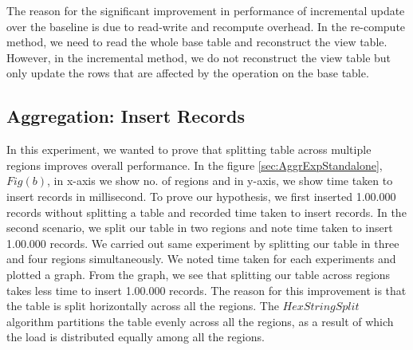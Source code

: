 \documentclass[11pt,a4paper,bibtotoc,idxtotoc,headsepline,footsepline,footexclude,BCOR12mm,DIV13]{scrbook}
\begin{document}
The reason for the significant improvement in performance of incremental update over the baseline is due to read-write and recompute overhead.
In the re-compute method, we need to read the whole base table and
reconstruct the view table. However, in the incremental method, we do not reconstruct the view table but only update the rows that are affected by the operation on the base table. 

\subsection{Aggregation: Insert Records}
\label{Insert Records Aggr}

In this experiment, we wanted to prove that splitting table across multiple regions improves overall performance. In the figure \ref{sec:AggrExpStandalone}, $Fig(b)$, in x-axis we show no. of regions and in y-axis, we show time taken to insert records in millisecond. To prove our hypothesis, we first inserted 1.00.000 records without splitting a table and recorded time taken to insert records. In the second scenario, we split our table in two regions and note time taken to insert 1.00.000 records. We carried out same experiment by splitting our table in three and four regions simultaneously. We noted time taken for each experiments and plotted a graph. From the graph, we see that splitting our table across regions takes less time to insert 1.00.000 records. The reason for this improvement is that the table is split horizontally across all the regions. The $HexStringSplit$ algorithm partitions the table evenly across all the regions, as a result of which the load is distributed equally among all the regions.


\end{document}
